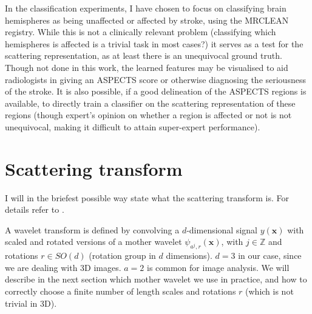 \documentclass[twocolumn, openany, oneside, article]{memoir}
\begin{document}
In the classification experiments, I have chosen to focus on classifying brain hemispheres as being unaffected or
affected by stroke, using the MRCLEAN registry. While this is not a clinically relevant problem (classifying which
hemispheres is affected is a trivial task in most cases?) it serves as a test for the scattering representation, as at
least there is an unequivocal ground truth. Though not done in this work, the learned features may be visualised to aid
radiologists in giving an ASPECTS score or otherwise diagnosing the seriousness of the stroke. It is also possible, if a
good delineation of the ASPECTS regions is available, to directly train a classifier on the scattering representation of
these regions (though expert's opinion on whether a region is affected or not is not unequivocal, making it difficult to
attain super-expert performance).


\chapter{Scattering transform}
I will in the briefest possible way state what the scattering transform is. For details
refer to \cite{anden2014deep, bruna2013invariant}.

A wavelet transform is defined by convolving a $d$-dimensional signal $y(\bm{x})$ with scaled and rotated versions of a
mother wavelet $\psi_{a^j, r}(\bm{x})$, with $j \in \mathbb{Z}$ and rotations $r \in SO(d)$ (rotation group in $d$
dimensions). $d = 3$ in our case, since we are dealing with 3D images. $a = 2$ is common for image analysis. We will
describe in the next section which mother wavelet we use in practice, and how to correctly choose a finite number of
length scales and rotations $r$ (which is not trivial in 3D).
\end{document}
